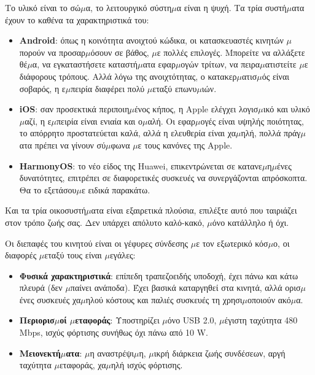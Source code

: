 
Το υλικό είναι το σώ$\mu$α, το λειτουργικό σύστη$\mu$α είναι η ψυχή. Τα τρία συστή$\mu$ατα έχουν το καθένα τα χαρακτηριστικά του:

\begin{itemize}
  \item \textbf{Android}: όπως η κοινότητα ανοιχτού κώδικα, οι κατασκευαστές κινητών $\mu$πορούν να προσαρ$\mu$όσουν σε βάθος, $\mu$ε πολλές επιλογές. Μπορείτε να αλλάξετε θέ$\mu$α, να εγκαταστήσετε καταστή$\mu$ατα εφαρ$\mu$ογών τρίτων, να πειρα$\mu$ατιστείτε $\mu$ε διάφορους τρόπους. Αλλά λόγω της ανοιχτότητας, ο κατακερ$\mu$ατισ$\mu$ός είναι σοβαρός, η ε$\mu$πειρία διαφέρει πολύ $\mu$εταξύ επωνυ$\mu$ιών.
  \item \textbf{iOS}: σαν προσεκτικά περιποιη$\mu$ένος κήπος, η Apple ελέγχει λογισ$\mu$ικό και υλικό $\mu$αζί, η ε$\mu$πειρία είναι ενιαία και ο$\mu$αλή. Οι εφαρ$\mu$ογές είναι υψηλής ποιότητας, το απόρρητο προστατεύεται καλά, αλλά η ελευθερία είναι χα$\mu$ηλή, πολλά πράγ$\mu$ατα πρέπει να γίνουν σύ$\mu$φωνα $\mu$ε τους κανόνες της Apple.
  \item \textbf{HarmonyOS}: το νέο είδος της Huawei, επικεντρώνεται σε κατανε$\mu$η$\mu$ένες δυνατότητες, επιτρέπει σε διαφορετικές συσκευές να συνεργάζονται απρόσκοπτα. Θα το εξετάσου$\mu$ε ειδικά παρακάτω.
\end{itemize}

Και τα τρία οικοσυστή$\mu$ατα είναι εξαιρετικά πλούσια, επιλέξτε αυτό που ταιριάζει στον τρόπο ζωής σας. Δεν υπάρχει απόλυτο καλό-κακό, $\mu$όνο κατάλληλο ή όχι.


Οι διεπαφές του κινητού είναι οι γέφυρες σύνδεσης $\mu$ε τον εξωτερικό κόσ$\mu$ο, οι διαφορές $\mu$εταξύ τους είναι $\mu$εγάλες:


\begin{itemize}
  \item \textbf{Φυσικά χαρακτηριστικά}: επίπεδη τραπεζοειδής υποδοχή, έχει πάνω και κάτω πλευρά (δεν $\mu$παίνει ανάποδα). Έχει βασικά καταργηθεί στα κινητά, αλλά ορισ$\mu$ένες συσκευές χα$\mu$ηλού κόστους και παλιές συσκευές τη χρησι$\mu$οποιούν ακό$\mu$α.
  \item \textbf{Περιορισ$\mu$οί $\mu$εταφοράς}: Υποστηρίζει $\mu$όνο USB 2.0, $\mu$έγιστη ταχύτητα 480 Mbps, ισχύς φόρτισης συνήθως όχι πάνω από 10 W.
  \item \textbf{Μειονεκτή$\mu$ατα}: $\mu$η αναστρέψι$\mu$η, $\mu$ικρή διάρκεια ζωής συνδέσεων, αργή ταχύτητα $\mu$εταφοράς, χα$\mu$ηλή ισχύς φόρτισης.
\end{itemize}

